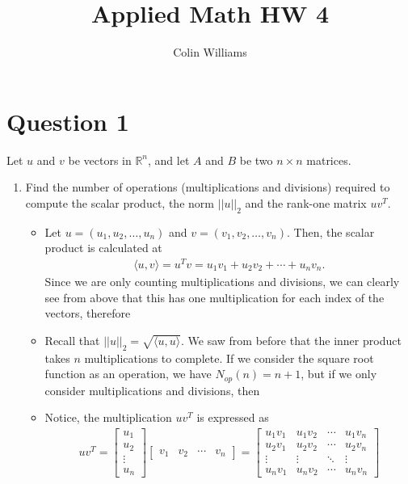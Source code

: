 \documentclass[10pt,a4paper]{article}
\title{Applied Math HW 4}
\author{Colin Williams}
\theoremstyle{definition}
\theoremstyle{definition}
\numberwithin{equation}{section}
\begin{document}
\maketitle

\section*{Question 1}
Let $u$ and $v$ be vectors in $\mathbb{R}^n$, and let $A$ and $B$ be two $n \times n$ matrices. 
\begin{enumerate}[label = (\alph*)]
\item Find the number of operations (multiplications and divisions) required to compute the scalar product, the norm $||u||_2$ and the rank-one matrix $uv^T$. 
	\begin{itemize}
	\item Let $u = (u_1, u_2, \ldots, u_n)$ and $v = (v_1, v_2, \ldots, v_n)$. Then, the scalar product is calculated at
	\begin{align*}
	\langle u, v \rangle = u^T v = u_1v_1 + u_2 v_2 + \cdots + u_n v_n.
	\end{align*}
	Since we are only counting multiplications and divisions, we can clearly see from above that this has one multiplication for each index of the vectors, therefore 
	\item Recall that $||u||_2 = \sqrt{\langle u, u \rangle }$. We saw from before that the inner product takes $n$ multiplications to complete. If we consider the square root function as an operation, we have $N_{op}(n) = n + 1$, but if we only consider multiplications and divisions, then 
	\item Notice, the multiplication $uv^T$ is expressed as
	\begin{align*}
	uv^T = \begin{bmatrix}
	u_1\\u_2\\ \vdots \\ u_n
	\end{bmatrix} \begin{bmatrix}
	v_1 & v_2 & \cdots & v_n
	\end{bmatrix} = \begin{bmatrix}
	u_1v_1 & u_1v_2 & \cdots & u_1v_n\\
	u_2v_1 & u_2v_2 & \cdots & u_2v_n\\
	\vdots & \vdots & \ddots & \vdots\\
	u_nv_1 & u_nv_2 & \cdots & u_nv_n
	\end{bmatrix}

\end{align*}
\end{itemize}
\end{enumerate}
\end{document}
